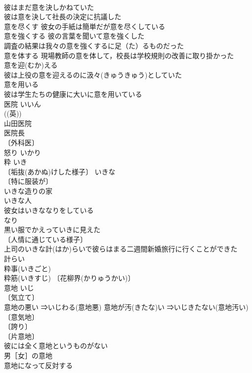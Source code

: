\documentclass[8pt]{extreport}
\begin{document}
\begin{CJK}{UTF8}{min}
\\	彼はまだ意を決しかねていた 
\\	彼は意を決して社長の決定に抗議した 
\\	意を尽くす 彼女の手紙は簡単だが意を尽くしている 
\\	意を強くする 彼の言葉を聞いて意を強くした 
\\	調査の結果は我々の意を強くするに足（た）るものだった 
\\	意を体する 現場教師の意を体して，校長は学校規則の改善に取り掛かった 
\\	意を迎(むか)える　
\\	彼は上役の意を迎えるのに汲々(きゅうきゅう)としていた 
\\	意を用いる 
\\	彼は学生たちの健康に大いに意を用いている 
\\	医院	いいん	
\\	((英)) 
\\	山田医院 
\\	医院長 
\\	〔外科医〕
\\	怒り	いかり	
\\	粋	いき	
\\	〔垢抜(あかぬ)けした様子〕 いきな 
\\	〔特に服装が〕
\\	いきな造りの家 
\\	いきな人 
\\	彼女はいきななりをしている 
\\	なり 
\\	黒い服でかえっていきに見えた 
\\	〔人情に通じている様子〕
\\	上司のいきな計(はか)らいで彼らはまる二週間新婚旅行に行くことができた 
\\	計らい　
\\	粋事(いきごと) 
\\	粋筋(いきすじ) 〔花柳界(かりゅうかい)〕
\\	意地	いじ	
\\	〔気立て〕
\\	意地の悪い ⇒いじわる(意地悪) 意地が汚(きたな)い ⇒いじきたない(意地汚い) 
\\	〔意気地〕
\\	〔誇り〕
\\	〔片意地〕
\\	彼には全く意地というものがない 
\\	男［女］の意地 
\\	意地になって反対する 

\end{CJK}
\end{document}
